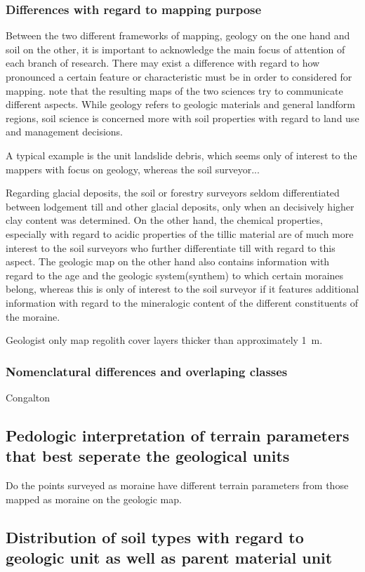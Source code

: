 \documentclass[preprint,12pt,authoryear]{elsarticle}
\begin{document}
\subsubsection{Differences with regard to mapping purpose}
Between the two different frameworks of mapping, geology on the one hand and soil on the other, it is important to acknowledge the main focus of attention of each branch of research. There may exist a difference with regard to how pronounced a certain feature or characteristic must be in order to considered for mapping. \cite{Miller2015a} note that the resulting maps of the two sciences try to communicate different aspects. While geology refers to geologic materials and general landform regions, soil science is concerned more with soil properties with regard to land use and management decisions.

A typical example is the unit landslide debris, which seems only of interest to the mappers with focus on geology, whereas the soil surveyor...

Regarding glacial deposits, the soil or forestry surveyors seldom differentiated between lodgement till and other glacial deposits, only when an decisively higher clay content was determined. On the other hand, the chemical properties, especially with regard to acidic properties of the tillic material are of much more interest to the soil surveyors who further differentiate till with regard to this aspect. The geologic map on the other hand also contains information with regard to the age and the geologic system(synthem) to which certain moraines belong, whereas this is only of interest to the soil surveyor if it features additional information with regard to the mineralogic content of the different constituents of the moraine.

Geologist only map regolith cover layers thicker than approximately 1~m.

\subsubsection{Nomenclatural differences and overlaping classes}
Congalton 

\subsection{Pedologic interpretation of terrain parameters that best seperate the geological units}
Do the points surveyed as moraine have different terrain parameters from those mapped as moraine on the geologic map.
\subsection{Distribution of soil types with regard to geologic unit as well as parent material unit}
\end{document}
